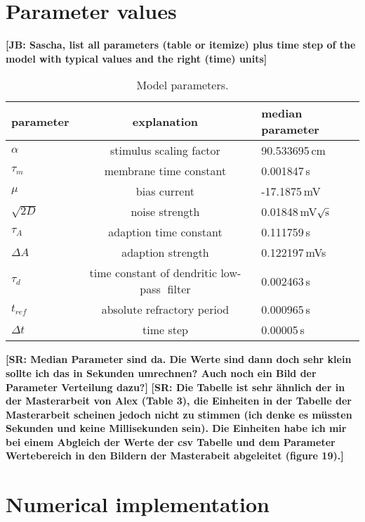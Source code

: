 \documentclass[12pt,a4paper]{article}
\newcommand{\note}[2][]{\textbf{[#1: #2]}}
\begin{document}
\section{Parameter values}

\note[JB]{Sascha, list all parameters (table or itemize) plus time step of the model with typical values and the right (time) units}

\begin{table}[h!]
  \begin{center}
    \caption{Model parameters.}
    \label{tab:table1}
    \begin{tabular}{l|c|l}
      
      parameter & explanation & median parameter \\
      \hline
      $\alpha$  & stimulus scaling factor &  90.533695\,cm \\
      $\tau_{m}$  & membrane time constant &  0.001847\,s\\       
      $\mu$  & bias current &  -17.1875\,mV\\      
      $\sqrt{2D}$  & noise strength &  0.01848\,mV$\sqrt{\textup{s}}$ \\      
      $\tau_{A}$  & adaption time constant &  0.111759\,s\\      
      $\Delta A$  & adaption strength &  0.122197\,mVs\\      
      $\tau_{d}$  & time constant of dendritic low-pass filter &  0.002463\,s\\      
      $t_{ref}$  & absolute refractory period &  0.000965\,s\\     
	  $\Delta t$  & time step &  0.00005\,s\\           
    \end{tabular}
  \end{center}
\end{table}

\note[SR]{Median Parameter sind da. Die Werte sind dann doch sehr klein sollte ich das in Sekunden umrechnen? Auch noch ein Bild der Parameter Verteilung dazu?}
\note[SR]{Die Tabelle ist sehr ähnlich der in der Masterarbeit von Alex (Table 3), die Einheiten in der Tabelle der Masterarbeit scheinen jedoch nicht zu stimmen (ich denke es müssten Sekunden und keine Millisekunden sein). Die Einheiten habe ich mir bei einem Abgleich der Werte der csv Tabelle und dem Parameter Wertebereich in den Bildern der Masterabeit abgeleitet (figure 19).}




\section{Numerical implementation}
\end{document}
